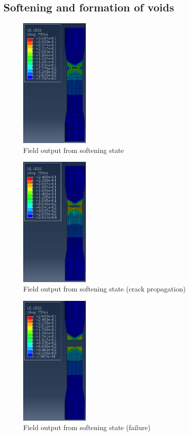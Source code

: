 \documentclass[11pt]{article}
\numberwithin{equation}{section}
\begin{document}
\subsection{Softening and formation of voids}
\begin{figure}[H]
    \centering
    \includegraphics[width = 0.3\textwidth]{./img/softening.png}
    \caption{Field output from softening state}
\end{figure}
\begin{figure}[H]
    \centering
    \includegraphics[width = 0.3\textwidth]{./img/softening2.png}
    \caption{Field output from softening state (crack propagation)}
\end{figure}
\begin{figure}[H]
    \centering
    \includegraphics[width = 0.3\textwidth]{./img/softening3.png}
    \caption{Field output from softening state (failure)}
\end{figure}
\end{document}
